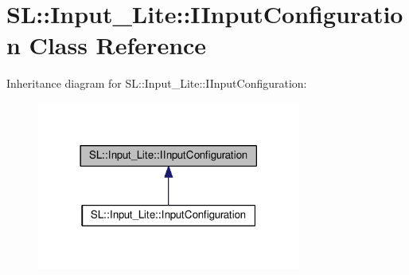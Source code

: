 \hypertarget{class_s_l_1_1_input___lite_1_1_i_input_configuration}{}\section{SL\+:\+:Input\+\_\+\+Lite\+:\+:I\+Input\+Configuration Class Reference}
\label{class_s_l_1_1_input___lite_1_1_i_input_configuration}


Inheritance diagram for SL\+:\+:Input\+\_\+\+Lite\+:\+:I\+Input\+Configuration\+:
\nopagebreak
\begin{figure}[H]
\begin{center}
\leavevmode
\includegraphics[width=246pt]{class_s_l_1_1_input___lite_1_1_i_input_configuration__inherit__graph}
\end{center}
\end{figure}
